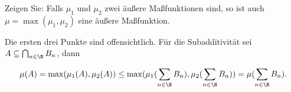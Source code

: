 
\begin{exercise}

Zeigen Sie: Falls $\mu_1$ und $\mu_2$ zwei äußere Maßfunktionen sind, so ist auch $\mu = \max(\mu_1, \mu_2)$ eine äußere Maßfunktion.

\end{exercise}


\begin{solution}

Die ersten drei Punkte sind offensichtlich. Für die Subadditivität sei $A \subseteq \bigcap_{n \in \N} B_n$, dann

\begin{align*}
  \mu(A)
  =
  \max(\mu_1(A), \mu_2(A))
  \leq
  \max(\mu_1(\sum_{n \in \N} B_n), \mu_2(\sum_{n \in \N} B_n))
  =
  \mu(\sum_{n \in \N} B_n).
\end{align*}

\end{solution}

